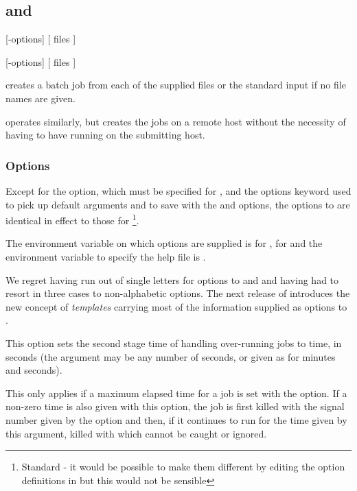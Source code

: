 \subsection{\BtrName{} and \RbtrName{}}

\begin{expara}

\BtrName{} [-options] [ files ]

\RbtrName{} [-options] [ files ]

\end{expara}

\PrBtr{} creates a \ProductName{} batch job from each of the supplied files or the standard input if no file names are given.

\PrRbtr{} operates similarly, but creates the jobs on a remote host without the necessity of having to have \ProductName{} running on the submitting host.

\subsubsection{Options}
Except for the  option, which must be specified for \PrRbtr{}, and the options keyword used
to pick up default arguments and to save with the  and  options, the options to \PrRbtr{} are identical in effect to those for \PrBtr{}\footnote{Standard - it would be possible to make them different by editing the option definitions in
 but this would not be sensible}.

The environment variable on which options are supplied is
\filename{\BtrVarname} for \PrBtr{}, \filename{\RbtrVarname} for \PrRbtr{} and the environment variable to specify the help file is
.

We regret having run out of single letters for options to \PrBtr{} and \PrRbtr{} and having had to resort in three cases to non-alphabetic options. The
next release of \ProductName{} introduces the new concept of \textit{templates} carrying most of the information supplied as options to
\PrBtr{}.
\explainopt


This option sets the second stage time of handling over-running jobs to time, in seconds (the argument may be any number of seconds, or given
as  for minutes and seconds).

This only applies if a maximum elapsed time for a job is set with the  option. If a non-zero time is also given
with this option, the job is first killed with the signal number given by the  option and then, if it continues to
run for the time given by this argument, killed with  which cannot be caught or ignored.

